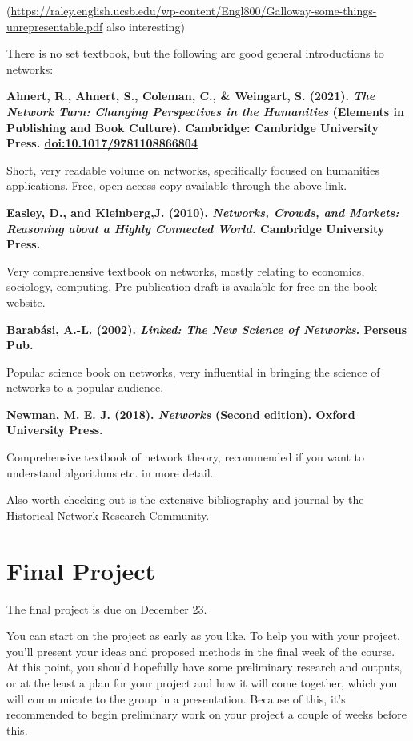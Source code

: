 \documentclass[
]{book}
\begin{document}
(\url{https://raley.english.ucsb.edu/wp-content/Engl800/Galloway-some-things-unrepresentable.pdf}
also interesting)

There is no set textbook, but the following are good general
introductions to networks:

\textbf{Ahnert, R., Ahnert, S., Coleman, C., \& Weingart, S. (2021). \emph{The
Network Turn: Changing Perspectives in the Humanities} (Elements in
Publishing and Book Culture). Cambridge: Cambridge University Press.
\url{doi:10.1017/9781108866804}}

Short, very readable volume on networks, specifically focused on
humanities applications. Free, open access copy available through the
above link.

\textbf{Easley, D., and Kleinberg,J. (2010). \emph{Networks, Crowds, and Markets:
Reasoning about a Highly Connected World.} Cambridge University Press.}

Very comprehensive textbook on networks, mostly relating to economics,
sociology, computing. Pre-publication draft is available for free on the
\href{https://www.cs.cornell.edu/home/kleinber/networks-book/}{book website}.

\textbf{Barabási, A.-L. (2002). \emph{Linked: The New Science of Networks}. Perseus
Pub.}

Popular science book on networks, very influential in bringing the
science of networks to a popular audience.

\textbf{Newman, M. E. J. (2018). \emph{Networks} (Second edition). Oxford
University Press.}

Comprehensive textbook of network theory, recommended if you want to
understand algorithms etc. in more detail.

Also worth checking out is the \href{https://historicalnetworkresearch.org/bibliography/}{extensive
bibliography} and
\href{https://jhnr.uni.lu/index.php/jhnr}{journal} by the Historical Network
Research Community.

\hypertarget{final-project}{%
\section{Final Project}\label{final-project}}

The final project is due on December 23.

You can start on the project as early as you like. To help you with your
project, you'll present your ideas and proposed methods in the final
week of the course. At this point, you should hopefully have some
preliminary research and outputs, or at the least a plan for your
project and how it will come together, which you will communicate to the
group in a presentation. Because of this, it's recommended to begin
preliminary work on your project a couple of weeks before this.
\end{document}
